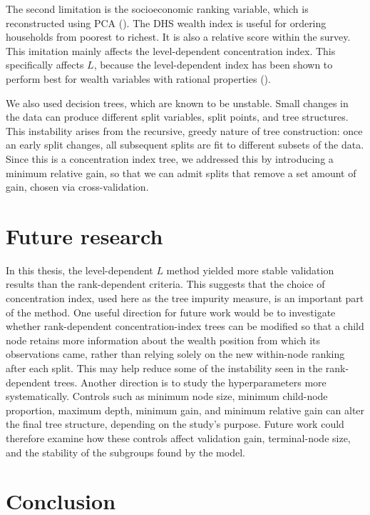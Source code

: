 \documentclass[
  11pt,
  a4paper,
]{article}
\begin{document}
The second limitation is the socioeconomic ranking variable, which is
reconstructed using PCA
(). The DHS wealth index is useful for ordering households from
poorest to richest. It is also a relative score within the survey. This
imitation mainly affects the level-dependent concentration index. This
specifically affects \(L\), because the level-dependent index has been
shown to perform best for wealth variables with rational properties
().

We also used decision trees, which are known to be unstable. Small
changes in the data can produce different split variables, split points,
and tree structures. This instability arises from the recursive, greedy
nature of tree construction: once an early split changes, all subsequent
splits are fit to different subsets of the data. Since this is a
concentration index tree, we addressed this by introducing a minimum
relative gain, so that we can admit splits that remove a set amount of
gain, chosen via cross-validation.

\section{Future research}\label{future-research}

In this thesis, the level-dependent \(L\) method yielded more stable
validation results than the rank-dependent criteria. This suggests that
the choice of concentration index, used here as the tree impurity
measure, is an important part of the method. One useful direction for
future work would be to investigate whether rank-dependent
concentration-index trees can be modified so that a child node retains
more information about the wealth position from which its observations
came, rather than relying solely on the new within-node ranking after
each split. This may help reduce some of the instability seen in the
rank-dependent trees. Another direction is to study the hyperparameters
more systematically. Controls such as minimum node size, minimum
child-node proportion, maximum depth, minimum gain, and minimum relative
gain can alter the final tree structure, depending on the study's
purpose. Future work could therefore examine how these controls affect
validation gain, terminal-node size, and the stability of the subgroups
found by the model.

\section{Conclusion}\label{conclusion}
\end{document}
